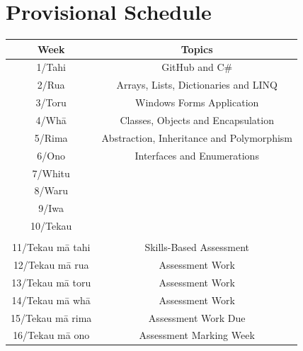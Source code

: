 \documentclass{article}
\begin{document}
\section*{Provisional Schedule}
\renewcommand{\arraystretch}{1.5}
\begin{tabular}{|c|c|c|}
	\hline
	\textbf{Week}                  & \multicolumn{2}{c|}{\textbf{Topics}}                                                                                             \\ \hline
	1/Tahi            & \multicolumn{2}{c|}{GitHub and C\#}    \\ \hline
	2/Rua             & \multicolumn{2}{c|}{Arrays, Lists, Dictionaries and LINQ}                   \\ \hline
	3/Toru            & \multicolumn{2}{c|}{Windows Forms Application} \\ \hline
	4/Whā             & \multicolumn{2}{c|}{Classes, Objects and Encapsulation}                               \\ \hline
	5/Rima            & \multicolumn{2}{c|}{Abstraction, Inheritance and Polymorphism}                                                \\ \hline
	6/Ono              & \multicolumn{2}{c|}{Interfaces and Enumerations}                                                   \\ \hline
	7/Whitu           &  \multicolumn{2}{c|}{}                            \\ \hline
	8/Waru   & \multicolumn{2}{c|}{}                                                   \\ \hline
	9/Iwa            & \multicolumn{2}{c|}{}                                                                 \\ \hline
	10/Tekau          & \multicolumn{2}{c|}{}                                                                 \\  \hline
	\rowcolor{yellow} \multicolumn{3}{|c|}{Mid Semester Break}                                                                                                                         \\ \hline
	11/Tekau mā tahi & \multicolumn{2}{c|}{Skills-Based Assessment}                                                                 \\ \hline
	12/Tekau mā rua  & \multicolumn{2}{c|}{Assessment Work}                                                                 \\ \hline
	13/Tekau mā toru  & \multicolumn{2}{c|}{Assessment Work}                                                     \\ \hline
	14/Tekau mā whā  & \multicolumn{2}{c|}{Assessment Work} \\ \hline 
	15/Tekau mā rima  & \multicolumn{2}{c|}{Assessment Work Due}                                                       \\ \hline
	16/Tekau mā ono   & \multicolumn{2}{c|}{Assessment Marking Week}                                                         \\ \hline
\end{tabular}
\end{document}

